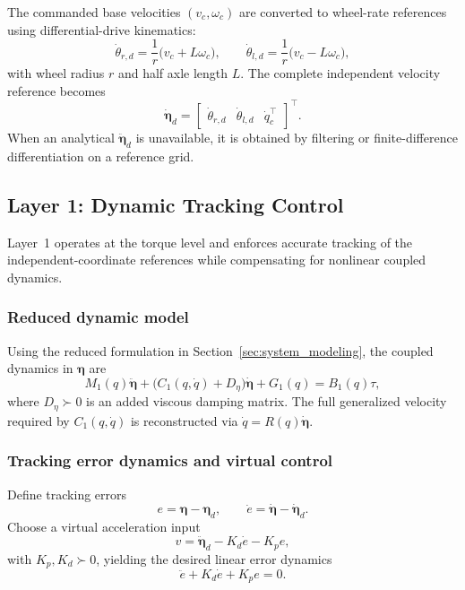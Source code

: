 \documentclass[conference]{IEEEtran}
\newcommand{\etav}{\bm{\eta}}
\begin{document}
The commanded base velocities $(v_c,\omega_c)$ are converted to wheel-rate
references using differential-drive kinematics:
\begin{equation}
\dot{\theta}_{r,d}=\frac{1}{r}\big(v_c+L\omega_c\big),\qquad
\dot{\theta}_{l,d}=\frac{1}{r}\big(v_c-L\omega_c\big),
\label{eq:wheel_rates_from_vw}
\end{equation}
with wheel radius $r$ and half axle length $L$. The complete independent
velocity reference becomes
\begin{equation}
\dot{\etav}_d=
\begin{bmatrix}
\dot{\theta}_{r,d} & \dot{\theta}_{l,d} & \dot q_c^\top
\end{bmatrix}^{\!\top}.
\label{eq:eta_dot_ref}
\end{equation}
When an analytical $\ddot{\etav}_d$ is unavailable, it is obtained by filtering
or finite-difference differentiation on a reference grid.

\subsection{Layer 1: Dynamic Tracking Control}
\label{subsec:layer_dynamics}

Layer~1 operates at the torque level and enforces accurate tracking of the
independent-coordinate references while compensating for nonlinear coupled
dynamics.

\subsubsection{Reduced dynamic model}

Using the reduced formulation in Section~\ref{sec:system_modeling}, the coupled
dynamics in $\etav$ are
\begin{equation}
M_1(q)\ddot{\etav}
+
\big(C_1(q,\dot q)+D_\eta\big)\dot{\etav}
+
G_1(q)
=
B_1(q)\tau,
\label{eq:reduced_dyn_layer1}
\end{equation}
where $D_\eta\succ0$ is an added viscous damping matrix. The full generalized
velocity required by $C_1(q,\dot q)$ is reconstructed via
$\dot q = R(q)\dot{\etav}$.

\subsubsection{Tracking error dynamics and virtual control}

Define tracking errors
\begin{equation}
e=\etav-\etav_d,\qquad \dot e=\dot{\etav}-\dot{\etav}_d.
\end{equation}
Choose a virtual acceleration input
\begin{equation}
v=\ddot{\etav}_d - K_d \dot e - K_p e,
\label{eq:virtual_v}
\end{equation}
with $K_p,K_d\succ0$, yielding the desired linear error dynamics
\begin{equation}
\ddot e + K_d \dot e + K_p e = 0.
\label{eq:err_dyn}
\end{equation}
\end{document}
